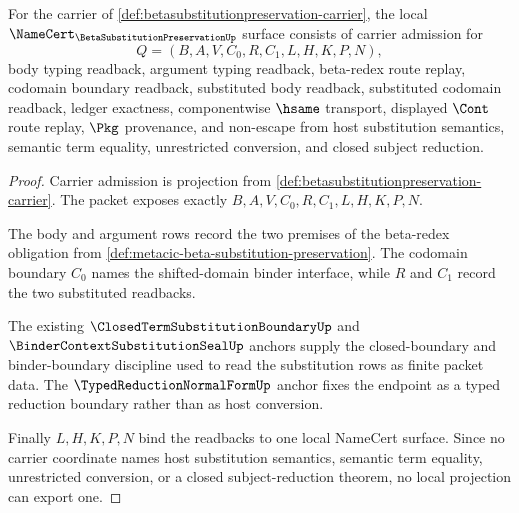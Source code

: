 \begin{theorem}
\label{thm:betasubstitutionpreservation-namecert-obligations}
For the carrier of \autoref{def:betasubstitutionpreservation-carrier}, the local $\NameCert_{\BetaSubstitutionPreservationUp}$ surface consists of carrier admission for
$$
Q=(B,A,V,C_0,R,C_1,L,H,K,P,N),
$$
body typing readback, argument typing readback, beta-redex route replay, codomain boundary readback, substituted body readback, substituted codomain readback, ledger exactness, componentwise $\hsame$ transport, displayed $\Cont$ route replay, $\Pkg$ provenance, and non-escape from host substitution semantics, semantic term equality, unrestricted conversion, and closed subject reduction.
\end{theorem}
\begin{proof}
Carrier admission is projection from \autoref{def:betasubstitutionpreservation-carrier}. The packet exposes exactly $B,A,V,C_0,R,C_1,L,H,K,P,N$.

The body and argument rows record the two premises of the beta-redex obligation from \autoref{def:metacic-beta-substitution-preservation}. The codomain boundary $C_0$ names the shifted-domain binder interface, while $R$ and $C_1$ record the two substituted readbacks.

The existing $\ClosedTermSubstitutionBoundaryUp$ and $\BinderContextSubstitutionSealUp$ anchors supply the closed-boundary and binder-boundary discipline used to read the substitution rows as finite packet data. The $\TypedReductionNormalFormUp$ anchor fixes the endpoint as a typed reduction boundary rather than as host conversion.

Finally $L,H,K,P,N$ bind the readbacks to one local NameCert surface. Since no carrier coordinate names host substitution semantics, semantic term equality, unrestricted conversion, or a closed subject-reduction theorem, no local projection can export one.
\end{proof}

